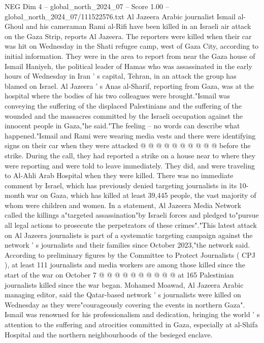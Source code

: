 \begin{textsample}{NEG Dim 4 – global\_north\_2024\_07 – Score 1.00 – global\_north\_2024\_07/111522576.txt}  \label{ex:f4_neg_285}
Al Jazeera Arabic journalist Ismail al-Ghoul and his cameraman Rami al-Rifi have been killed in an Israeli air attack on the Gaza Strip, reports Al Jazeera.
The reporters were killed when their car was hit on Wednesday in the Shati refugee camp, west of Gaza City, according to initial information.
They were in the area to report from near the Gaza house of Ismail Haniyeh, the political leader of Hamas who was assassinated in the early hours of Wednesday in Iran ' s capital, Tehran, in an attack the group has blamed on Israel.
Al Jazeera ' s Anas al-Sharif, reporting from Gaza, was at the hospital where the bodies of his two colleagues were brought."Ismail was conveying the suffering of the displaced Palestinians and the suffering of the wounded and the massacres committed by the Israeli occupation against the innocent people in Gaza,"he said."The feeling -- no words can describe what happened."Ismail and Rami were wearing media vests and there were identifying signs on their car when they were attacked @ @ @ @ @ @ @ @ @ @ before the strike.
During the call, they had reported a strike on a house near to where they were reporting and were told to leave immediately.
They did, and were traveling to Al-Ahli Arab Hospital when they were killed.
There was no immediate comment by Israel, which has previously denied targeting journalists in its 10-month war on Gaza, which has killed at least 39,445 people, the vast majority of whom were children and women.
In a statement, Al Jazeera Media Network called the killings a"targeted assassination"by Israeli forces and pledged to"pursue all legal actions to prosecute the perpetrators of these crimes"."This latest attack on Al Jazeera journalists is part of a systematic targeting campaign against the network ' s journalists and their families since October 2023,"the network said.
According to preliminary figures by the Committee to Protect Journalists ( CPJ ), at least 111 journalists and media workers are among those killed since the start of the war on October 7 @ @ @ @ @ @ @ @ @ @ at 165 Palestinian journalists killed since the war began.
Mohamed Moawad, Al Jazeera Arabic managing editor, said the Qatar-based network ' s journalists were killed on Wednesday as they were"courageously covering the events in northern Gaza".
Ismail was renowned for his professionalism and dedication, bringing the world ' s attention to the suffering and atrocities committed in Gaza, especially at al-Shifa Hospital and the northern neighbourhoods of the besieged enclave.

\end{textsample}
